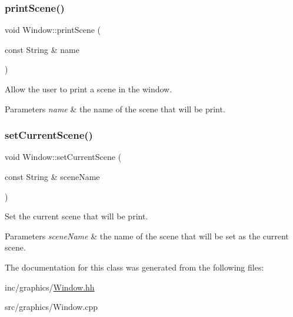 \subsubsection{\texorpdfstring{print\+Scene()}{printScene()}}
{\footnotesize\ttfamily void Window\+::print\+Scene (\begin{DoxyParamCaption}\item[{const String \&}]{name }\end{DoxyParamCaption})}



Allow the user to print a scene in the window. 


\begin{DoxyParams}{Parameters}
{\em \textquotesingle{}name\textquotesingle{}} & the name of the scene that will be print. \\
\hline
\end{DoxyParams}
\mbox{\label{classWindow_a3342dc02339a5974d5c6fcefd91d0cbf}} 
\subsubsection{\texorpdfstring{set\+Current\+Scene()}{setCurrentScene()}}
{\footnotesize\ttfamily void Window\+::set\+Current\+Scene (\begin{DoxyParamCaption}\item[{const String \&}]{scene\+Name }\end{DoxyParamCaption})}



Set the current scene that will be print. 


\begin{DoxyParams}{Parameters}
{\em \textquotesingle{}scene\+Name\textquotesingle{}} & the name of the scene that will be set as the current scene. \\
\hline
\end{DoxyParams}


The documentation for this class was generated from the following files\+:\begin{DoxyCompactItemize}
\item 
inc/graphics/\hyperlink{Window_8hh}{Window.\+hh}\item 
src/graphics/Window.\+cpp\end{DoxyCompactItemize}

